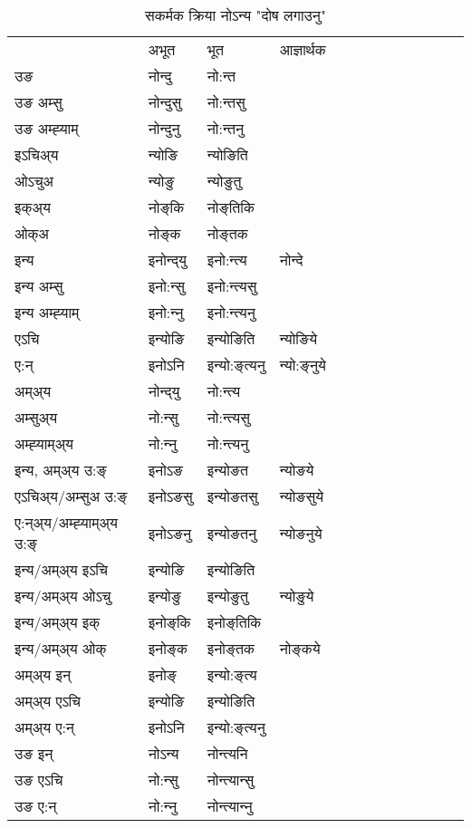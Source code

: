 \begin{table}[H]
\centering
\caption{\label{oŋt.vt} सकर्मक क्रिया  नोऽन्य  "दोष लगाउनु"  }
\begin{tabular}{l|l|l|l|l|l|l|l|l|l|l|l|l}  \toprule
&अभूत & भूत & आज्ञार्थक \\ 
उङ &नोन्दु &नो:न्त \\ 
उङ अम्सु&नोन्दुसु &नो:न्तसु \\ 
उङ अम्ह्‍याम्&नोन्दुनु &नो:न्तनु \\ 
इऽचिअ्य &न्योङि &न्योङिति   \\ 
ओऽचुअ        &न्योङु &न्योङुतु   \\ 
इक्अ्य&नोङ्‌कि &नोङ्‌तिकि   \\ 
ओक्अ &नोङ्‌क &नोङ्‌तक   \\ 
इन्य & इनोन्द्‌यु  & इनो:न्त्य &नोन्दे  \\ 
इन्य अम्सु& इनो:न्सु  & इनो:न्त्यसु   \\ 
इन्य अम्ह्‍याम्& इनो:न्‍नु  & इनो:न्त्यनु   \\ 
एऽचि & इन्योङि & इन्योङिति &न्योङिये    \\ 
ए:न् & इनोऽनि  & इन्यो:ङ्‌त्यनु &न्यो:ङ्‌नुये  \\ 
अम्अ्य & नोन्द्‌यु  & नो:न्त्य  \\ 
अम्सुअ्य & नो:न्सु & नो:न्त्यसु  \\ 
अम्ह्‍याम्अ्य & नो:न्‍नु  & नो:न्त्यनु \\ 
\midrule
इन्य, अम्अ्य उ:ङ्‌ &इनोऽङ &इन्योङत &न्योङये \\ 
एऽचिअ्य/अम्सुअ उ:ङ्‌ &इनोऽङसु &इन्योङतसु &न्योङसुये \\ 
ए:न्अ्य/अम्ह्‍याम्अ्य उ:ङ्‌ &इनोऽङनु &इन्योङतनु &न्योङनुये \\ 
इन्य/अम्अ्य इऽचि &इन्योङि &इन्योङिति    \\ 
इन्य/अम्अ्य ओऽचु &इन्योङु &इन्योङुतु  &न्योङुये  \\ 
इन्य/अम्अ्य इक् &इनोङ्‌कि &इनोङ्‌तिकि   \\ 
इन्य/अम्अ्य ओक् &इनोङ्‌क &इनोङ्‌तक  &नोङ्‌कये  \\ 
अम्अ्य इन् & इनोङ्‌ & इन्यो:ङ्‌त्य   \\ 
अम्अ्य एऽचि & इन्योङि & इन्योङिति    \\ 
अम्अ्य ए:न् & इनोऽनि  & इन्यो:ङ्‌त्यनु  \\ 
\midrule
उङ इन् & नोऽन्य  & नोन्त्यनि  \\ 
उङ एऽचि & नो:न्सु  & नोन्त्यान्सु   \\ 
उङ ए:न्& नो:न्‍नु  & नोन्त्यान्‍नु   \\ 
\bottomrule
\end{tabular}
\end{table}



